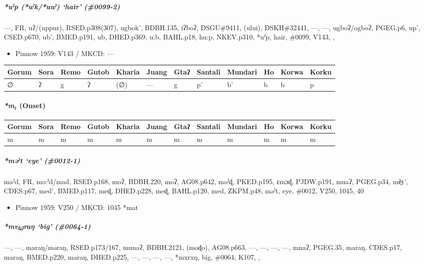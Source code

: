 \documentclass[a4paper,]{article}
\providecommand{\tightlist}{%
  \setlength{\itemsep}{0pt}\setlength{\parskip}{0pt}}
\let\oldparagraph\paragraph
\renewcommand{\paragraph}[1]{\oldparagraph{#1}\mbox{}}
\let\oldsubparagraph\subparagraph
\renewcommand{\subparagraph}[1]{\oldsubparagraph{#1}\mbox{}}
\begin{document}
\subparagraph{\texorpdfstring{\emph{*uˀp} (\emph{*uˀk/*uuˀ}) `hair'
(\#0099-2)}{*uˀp (*uˀk/*uuˀ) hair (\#0099-2)}}\label{uux2c0p-uux2c0kuuux2c0-hair-0099-2}

---, FR, uʔ/(uppur), RSED.p308(307), ugbok', BDBH.135, iʔboʔ,
DSGU\#9411, (ului), DSKH\#32441, ---, ---, ugboʔ/ogboʔ, PGEG.p6, up',
CSED.p670, ub', BMED.p191, ub, DHED.p369, u:b, BAHL.p18, hu:p,
NKEV.p310, *uˀp, hair, \#0099, V143, ,

\begin{itemize}
\tightlist
\item
  Pinnow 1959: V143 / MKCD: ---
\end{itemize}

\begin{longtable}[]{@{}llllllllllll@{}}
\toprule
Gorum & Sora & Remo & Gutob & Kharia & Juang & Gtaʔ & Santali & Mundari
& Ho & Korwa & Korku\tabularnewline
\midrule
\endhead
∅ & ʔ & g & ʔ & (∅) & --- & g & p' & b' & b & b & p\tabularnewline
\bottomrule
\end{longtable}

\paragraph{\texorpdfstring{\emph{*m₁}
(Onset)}{*m₁ (Onset)}}\label{m-onset}

\begin{longtable}[]{@{}llllllllllll@{}}
\toprule
Gorum & Sora & Remo & Gutob & Kharia & Juang & Gtaʔ & Santali & Mundari
& Ho & Korwa & Korku\tabularnewline
\midrule
\endhead
m & m & m & m & m & m & m & m & m & m & m & m\tabularnewline
\bottomrule
\end{longtable}

\subparagraph{\texorpdfstring{\emph{*məˀt} `eye'
(\#0012-1)}{*məˀt eye (\#0012-1)}}\label{mux259ux2c0t-eye-0012-1}

maˀd, FR, mo:ˀd/mad, RSED.p168, moʔ, BDBH.220, moʔ, AG08.p642, moˀɖ,
PKED.p195, ɛmɔɖ, PJDW.p191, muaʔ, PGEG.p34, mẽ̠t', CDES.p67, med',
BMED.p117, meɖ, DHED.p228, meɖ, BAHL.p120, med, ZKPM.p48, məˀt, eye,
\#0012, V250, 1045, 40

\begin{itemize}
\tightlist
\item
  Pinnow 1959: V250 / MKCD: 1045 *mat
\end{itemize}

\subparagraph{\texorpdfstring{\emph{*mv₍₄₎raŋ} `big'
(\#0064-1)}{*mv₍₄₎raŋ big (\#0064-1)}}\label{mvraux14b-big-0064-1}

---, ---, maraŋ/məraŋ, RSED.p173/167, munaʔ, BDBH.2121, (moɖo),
AG08.p663, ---, ---, ---, ---, mnaʔ, PGEG.35, maraŋ, CDES.p17, maraŋ,
BMED.p220, maraŋ, DHED.p225, ---, ---, ---, ---, *mxrxŋ, big, \#0064,
K107, ,
\end{document}
